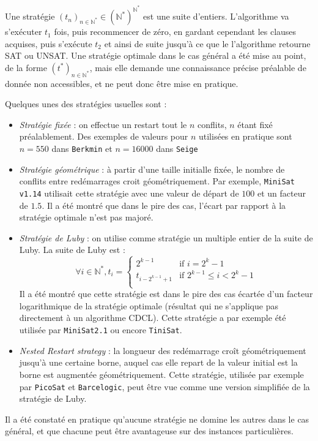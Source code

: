 Une stratégie $(t_n)_{n\in\mathbb{N}^*}\in(\mathbb{N}^*)^{\mathbb{N}^*}$ est
une suite d'entiers. L'algorithme va s'exécuter $t_1$ fois, puis recommencer de
zéro, en gardant cependant les clauses acquises, puis s'exécute $t_2$ et ainsi
de suite jusqu'à ce que le l'algorithme retourne SAT ou UNSAT. Une stratégie
optimale dans le cas général a été mise au point\cite{luby93}, de la forme
$(t^*)_{n\in\mathbb{N}^*}$, mais elle demande une connaissance précise
préalable de donnée non accessibles, et ne peut donc être mise en pratique.

Quelques unes des stratégies usuelles sont\cite{restarts} :
\begin{itemize}
    \item \textit{Stratégie fixée} : on effectue un restart tout le $n$
        conflits, $n$ étant fixé préalablement. Des exemples de valeurs pour
        $n$ utilisées en pratique sont $n=550$ dans \texttt{Berkmin} et
        $n=16000$ dans \texttt{Seige}
    \item \textit{Stratégie géométrique} : à partir d'une taille initialle fixée,
        le nombre de conflits entre redémarrages croit géométriquement. Par
        exemple, \texttt{MiniSat v1.14} utilisait cette stratégie avec une
        valeur de départ de $100$ et un facteur de $1.5$. Il a été montré que
        dans le pire des cas, l'écart par rapport à la stratégie optimale
        n'est pas majoré.
    \item \textit{Stratégie de Luby} : on utilise comme stratégie un multiple
        entier de la suite de Luby. La suite de Luby est :
        \[ \forall i\in\mathbb{N}^*,t_i = \left\{\begin{array}{cl}
            2^{k-1} & \text{if } i = 2^k-1 \\
            t_{i-2^{k-1}+1} & \text{if } 2^{k-1} \leq i < 2^k - 1 \\
        \end{array}\right. \]
        Il a été montré que cette stratégie est dans le pire des cas écartée
        d'un facteur logarithmique de la stratégie optimale (résultat qui
        ne s'applique pas directement à un algorithme CDCL). Cette stratégie a
        par exemple été utilisée par \texttt{MiniSat2.1} ou encore
        \texttt{TiniSat}.
    \item \textit{Nested Restart strategy} : la longueur des redémarrage croît
        géométriquement jusqu'à une certaine borne, auquel cas elle repart de
        la valeur initial est la borne est augmentée géométriquement. Cette
        stratégie, utilisée par exemple par \texttt{PicoSat} et
        \texttt{Barcelogic}, peut être vue comme une version simplifiée de la
        stratégie de Luby.
\end{itemize}

Il a été constaté en pratique qu'aucune stratégie ne domine les autres dans le
cas général, et que chacune peut être avantageuse sur des instances
particulières.


